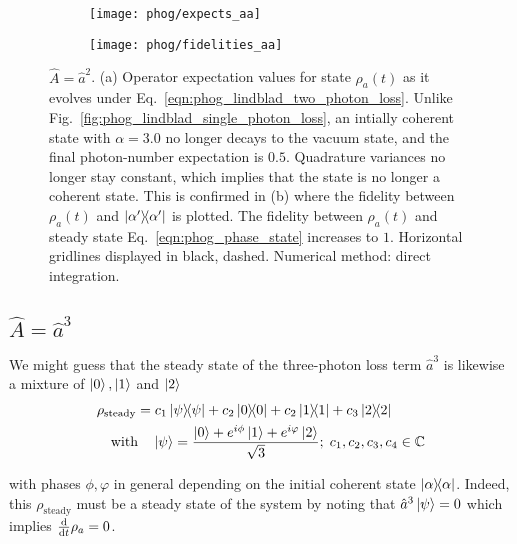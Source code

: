 \begin{figure}[htp]
\captionsetup{width=0.8\linewidth}
\centering
	\begin{subfigure}{0.7\linewidth}
	\centering
	\caption{}
	\texttt{[image: phog/expects\_aa]}
	\end{subfigure}
	\begin{subfigure}{0.7\linewidth}
	\centering
	\caption{}
	\texttt{[image: phog/fidelities\_aa]}
	\end{subfigure}
\caption{\label{fig:phog_lindblad_two_photon_loss}$\hat{A} = \hat{a}^2$. (a) Operator expectation values for state $\rho_a\left(t\right)$ as it evolves under Eq.~\ref{eqn:phog_lindblad_two_photon_loss}. Unlike Fig.~\ref{fig:phog_lindblad_single_photon_loss}, an intially coherent state with $\alpha=3.0$ no longer decays to the vacuum state, and the final photon-number expectation is $0.5$. Quadrature variances no longer stay constant, which implies that the state is no longer a coherent state. This is confirmed in (b) where the fidelity between $\rho_a\left(t\right)$ and $\dyad{\alpha^\prime}$ is plotted. The fidelity between $\rho_a\left(t\right)$ and steady state Eq.~\ref{eqn:phog_phase_state} increases to $1$. Horizontal gridlines displayed in black, dashed. Numerical method: direct integration.} %
\end{figure}

\iffalse
\clearpage
\subsection{$\hat{A} = \hat{a}^3$}\label{sec:A_aaa}
We might guess that the steady state of the three-photon loss term $\hat{a}^3$ is likewise a mixture of $\ket{0}, \ket{1}$ and $\ket{2}$
\begin{align}\label{eqn:phog_three_photon_loss_ss}
&\rho_{\text{steady}} = c_1 \dyad{\psi} + c_2 \dyad{0} + c_2 \dyad{1} + c_3 \dyad{2} \notag \\
%
&\qq{with} \ket{\psi} = \frac{\ket{0} + e^{i \phi}\ket{1} + e^{i \varphi}\ket{2}}{\sqrt{3}}; \; c_1, c_2, c_3, c_4 \in \mathbb{C}
\end{align}

\noindent with phases $\phi, \varphi$ in general depending on the initial coherent state $\dyad{\alpha}$. %
Indeed, this $\rho_{\text{steady}}$ must be a steady state of the system by noting that $\hat{a}^3 \ket{\psi} = 0$ which implies $\frac{\mathrm{d}}{\mathrm{d}t} \rho_a = 0$.

